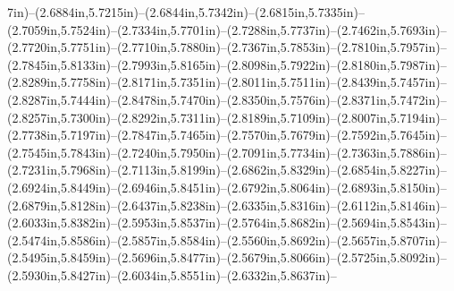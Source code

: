 7in)--(2.6884in,5.7215in)--(2.6844in,5.7342in)--(2.6815in,5.7335in)--(2.7059in,5.7524in)--(2.7334in,5.7701in)--(2.7288in,5.7737in)--(2.7462in,5.7693in)--(2.7720in,5.7751in)--(2.7710in,5.7880in)--(2.7367in,5.7853in)--(2.7810in,5.7957in)--(2.7845in,5.8133in)--(2.7993in,5.8165in)--(2.8098in,5.7922in)--(2.8180in,5.7987in)--(2.8289in,5.7758in)--(2.8171in,5.7351in)--(2.8011in,5.7511in)--(2.8439in,5.7457in)--(2.8287in,5.7444in)--(2.8478in,5.7470in)--(2.8350in,5.7576in)--(2.8371in,5.7472in)--(2.8257in,5.7300in)--(2.8292in,5.7311in)--(2.8189in,5.7109in)--(2.8007in,5.7194in)--(2.7738in,5.7197in)--(2.7847in,5.7465in)--(2.7570in,5.7679in)--(2.7592in,5.7645in)--(2.7545in,5.7843in)--(2.7240in,5.7950in)--(2.7091in,5.7734in)--(2.7363in,5.7886in)--(2.7231in,5.7968in)--(2.7113in,5.8199in)--(2.6862in,5.8329in)--(2.6854in,5.8227in)--(2.6924in,5.8449in)--(2.6946in,5.8451in)--(2.6792in,5.8064in)--(2.6893in,5.8150in)--(2.6879in,5.8128in)--(2.6437in,5.8238in)--(2.6335in,5.8316in)--(2.6112in,5.8146in)--(2.6033in,5.8382in)--(2.5953in,5.8537in)--(2.5764in,5.8682in)--(2.5694in,5.8543in)--(2.5474in,5.8586in)--(2.5857in,5.8584in)--(2.5560in,5.8692in)--(2.5657in,5.8707in)--(2.5495in,5.8459in)--(2.5696in,5.8477in)--(2.5679in,5.8066in)--(2.5725in,5.8092in)--(2.5930in,5.8427in)--(2.6034in,5.8551in)--(2.6332in,5.8637in)--
